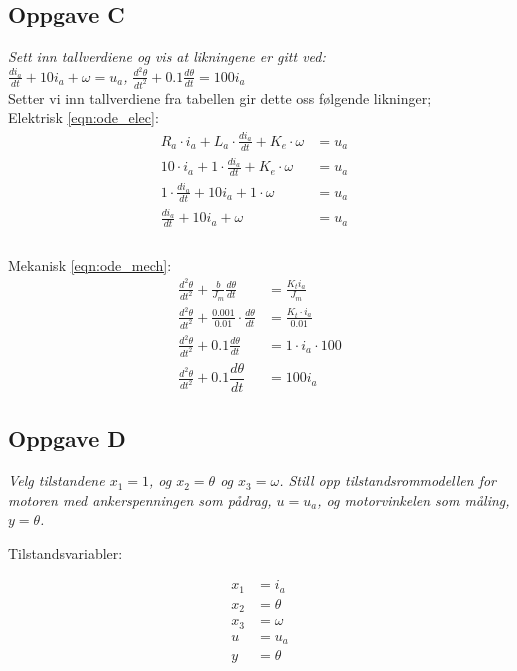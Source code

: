 \subsection{Oppgave C}

\emph{Sett inn tallverdiene og vis at likningene er gitt ved:\\ $\frac{di_a}{dt} + 10i_a + \omega = u_a$,  $ \frac{d^2\theta}{dt^2} + 0.1\frac{d\theta}{dt} = 100i_a$}\\
   

Setter vi inn tallverdiene fra tabellen gir dette oss følgende likninger;\\
Elektrisk \eqref{eqn:ode_elec}:
\begin{align*}
	R_a\cdot i_a + L_a\cdot \frac{di_a}{dt} + K_e\cdot \omega & = u_a &   \\
	10\cdot i_a + 1\cdot \frac{di_a}{dt} + K_e\cdot \omega    & = u_a &   \\
	1\cdot \frac{di_a}{dt} + 10i_a + 1\cdot \omega &= u_a \\
	\frac{di_a}{dt} + 10i_a + \omega &= u_a\\
\end{align*}\\
Mekanisk \eqref{eqn:ode_mech}:
\begin{align*}
	\frac{d^2\theta}{dt^2} + \frac{b}{J_m}\frac{d\theta}{dt}             & = \frac{K_ti_a}{J_m}        \\
	\frac{d^2\theta}{dt^2} + \frac{0.001}{0.01} \cdot \frac{d\theta}{dt} & = \frac{K_t\cdot i_a}{0.01} \\
	\frac{d^2\theta}{dt^2} + 0.1\frac{d\theta}{dt}                       & = 1\cdot i_a\cdot 100       \\
	\frac{d^2\theta}{dt^2} + 0.1\dfrac{d\theta}{dt}                      & = 100i_a                    
\end{align*}
    
\subsection{Oppgave D}

\emph{Velg tilstandene $x_1 = 1$, og $x_2 = \theta$ og $x_3 = \omega$. Still opp tilstandsrommodellen for motoren med ankerspenningen som pådrag, $u = u_a$, og motorvinkelen som måling, $y = \theta$.}
    
Tilstandsvariabler:

\begin{align*}
	x_1 & = i_a    \\        
	x_2 & = \theta \\     
	x_3 & = \omega \\     
	u   & = u_a    \\       
	y   & = \theta 
\end{align*}
   
